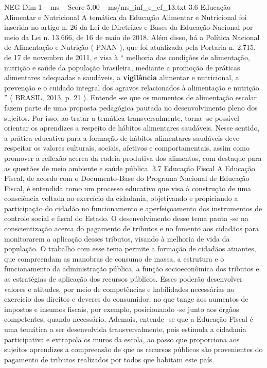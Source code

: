 \begin{textsample}{NEG Dim 1 – ms – Score 5.00 – ms/ms\_inf\_e\_ef\_13.txt}  \label{ex:f1_neg_108}
3.6 Educação Alimentar e Nutricional A temática da Educação Alimentar e Nutricional foi inserida no artigo n. 26 da Lei de Diretrizes e Bases da Educação Nacional por meio da Lei n. 13.666, de 16 de maio de 2018.
Além disso, há a Política Nacional de Alimentação e Nutrição ( PNAN ), que foi atualizada pela Portaria n. 2.715, de 17 de novembro de 2011, e visa à “ melhoria das condições de alimentação, nutrição e saúde da população brasileira, mediante a promoção de práticas alimentares adequadas e saudáveis, a \textbf{vigilância} alimentar e nutricional, a prevenção e o cuidado integral dos agravos relacionados à alimentação e nutrição ” ( BRASIL, 2013, p. 21 ).
Entende -se que os momentos de alimentação escolar fazem parte de uma proposta pedagógica pautada no desenvolvimento pleno dos sujeitos.
Por isso, ao tratar a temática transversalmente, torna -se possível orientar os aprendizes a respeito de hábitos alimentares saudáveis.
Nesse sentido, a prática educativa para a formação de hábitos alimentares saudáveis deve respeitar os valores culturais, sociais, afetivos e comportamentais, assim como promover a reflexão acerca da cadeia produtiva dos alimentos, com destaque para as questões de meio ambiente e saúde pública. 3.7 Educação Fiscal A Educação Fiscal, de acordo com o Documento-Base do Programa Nacional de Educação Fiscal, é entendida como um processo educativo que visa à construção de uma consciência voltada ao exercício da cidadania, objetivando e propiciando a participação do cidadão no funcionamento e aperfeiçoamento dos instrumentos de controle social e fiscal do Estado.
O desenvolvimento desse tema pauta -se na conscientização acerca do pagamento de tributos e no fomento aos cidadãos para monitorarem a aplicação desses tributos, visando à melhoria de vida da população.
O trabalho com esse tema permite a formação de cidadãos atuantes, que compreendam as manobras de consumo de massa, a estrutura e o funcionamento da administração pública, a função socioeconômica dos tributos e as estratégias de aplicação dos recursos públicos.
Esses poderão desenvolver valores e atitudes, por meio de competências e habilidades necessárias ao exercício dos direitos e deveres do consumidor, no que tange aos aumentos de impostos e insumos fiscais, por exemplo, posicionando -se junto aos órgãos competentes, quando necessário.
Ademais, entende -se que a Educação Fiscal é uma temática a ser desenvolvida transversalmente, pois estimula a cidadania participativa e extrapola os muros da escola, ao passo que proporciona aos sujeitos aprendizes a compreensão de que os recursos públicos são provenientes do pagamento de tributos realizados por todos que habitam este país.

\end{textsample}
